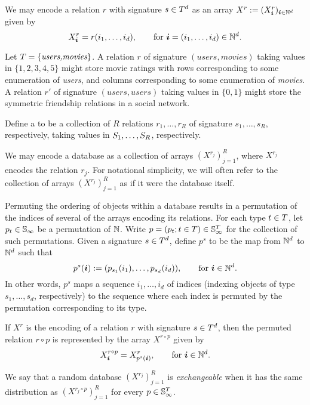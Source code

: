 We may encode a relation $r$ with signature $s \in T^d$ as an array $X^r := (X^r_{\bm{i}})_{\bm{i} \in \mathbb{N}^d}$ given by
\[
X^r_{\bm{i}} = r(i_1,\dotsc,i_d), \qquad \text{for } \bm{i} = (i_1,\dotsc, i_d) \in \mathbb{N}^d.
\]

\begin{example} 
Let $T = \{\textit{users,movies}\}$.
A relation $r$ of signature $(\textit{users},\textit{movies})$ taking values in $\{1,2,3,4,5\}$ might store movie ratings with rows corresponding to some enumeration of \textit{users}, and columns corresponding to some enumeration of \textit{movies}. 
A relation $r'$ of signature $(\textit{users},\textit{users})$ taking values in $\{0,1\}$ might store the symmetric friendship relations in a social network.
\end{example}

\begin{definition}[database]
Define a  to be a collection of $R$ relations $r_1,\dotsc,r_R$ of signature $s_1,\dotsc,s_R$, respectively, taking values in $S_1,\dotsc,S_R$, respectively.
\end{definition}

We may encode a database as a collection of arrays $(X^{r_j})_{j=1}^R$, where $X^{r_j}$ encodes the relation $r_j$.  
For notational simplicity, we will often refer to the collection of arrays $(X^{r_j})_{j=1}^R$ as if it were the database itself.

Permuting the ordering of objects within a database results in a permutation of the indices of several of the arrays encoding its relations.
For each type $t \in T$, let $p_t \in \mathbb{S}_{\infty}$ be a permutation of $\mathbb{N}$. 
Write $p = (p_t ; t \in T) \in \mathbb{S}_{\infty}^T$ for the collection of such permutations.
Given a signature $s \in T^d$, define $p^s$ to be the map from $\mathbb{N}^d$ to $\mathbb{N}^d$ such that
\[
p^s(\bm{i}) := (p_{s_1}(i_1), \dotsc,p_{s_d}(i_d)), \qquad \text{for } \bm{i} \in \mathbb{N}^d.
\]
In other words, $p^s$ maps a sequence $i_1,\dotsc,i_d$ of indices (indexing objects of type $s_1,\dotsc,s_d$, respectively) to the sequence where each index is permuted by the permutation corresponding to its type.

If $X^r$ is the encoding of a relation $r$ with signature $s \in T^d$, then the permuted relation $r \circ p$ is represented by the array $X^{r\circ p}$ given by
\[
X^{r \circ p}_{\bm{i}} = X^r_{p^s(\bm{i})}, \qquad \text{for } \bm{i} \in \mathbb{N}^d.
\]

\begin{definition}
We say that a random database $(X^{r_j})_{j=1}^R$ is \emph{exchangeable} when it has the same distribution as $(X^{r_j\circ p})_{j=1}^R$ for every $p \in \mathbb{S}_{\infty}^T$.
\end{definition}

